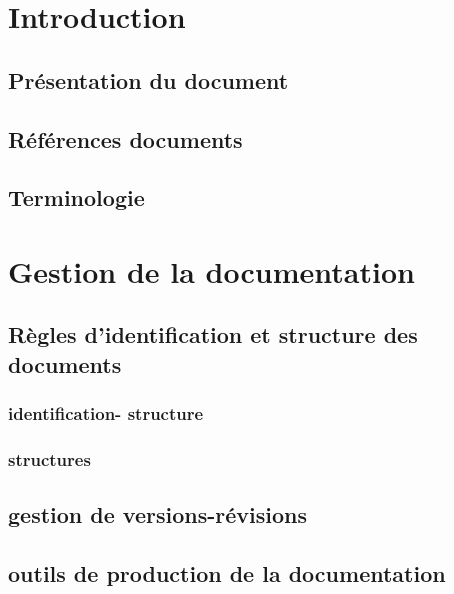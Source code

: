 \section{Introduction}
	\subsection{Présentation du document}


	\subsection{Références documents}


	\subsection{Terminologie}



\section{Gestion de la documentation}
	\subsection{Règles d’identification et structure des documents}
		\subsubsection{identification- structure}

		\subsubsection{structures}


	\subsection{gestion de versions-révisions}


	\subsection{outils de production de la documentation}

